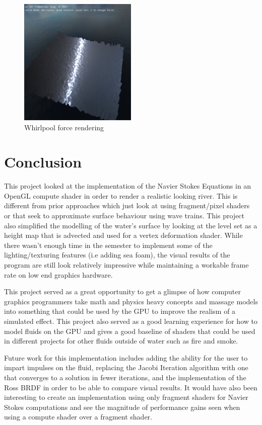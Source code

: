 \documentclass[conference]{IEEEtran}
\begin{document}
\begin{figure}[htbp]
\centerline{\includegraphics[width=0.5\textwidth]{whirl.png}}
\caption{Whirlpool force rendering}
\label{whirlrender}
\end{figure}

\section{Conclusion}

This project looked at the implementation of the Navier Stokes Equations in an OpenGL compute shader in order to render a realistic looking river. This is different from prior approaches which just look at using fragment/pixel shaders or that seek to approximate surface behaviour using wave trains. This project also simplified the modelling of the water's surface by looking at the level set as a height map that is advected and used for a vertex deformation shader. While there wasn't enough time in the semester to implement some of the lighting/texturing features (i.e adding sea foam), the visual results of the program are still look relatively impressive while maintaining a workable frame rate on low end graphics hardware.

This project served as a great opportunity to get a glimpse of how computer graphics programmers take math and physics heavy concepts and massage models into something that could be used by the GPU to improve the realism of a simulated effect. This project also served as a good learning experience for how to model fluids on the GPU and gives a good baseline of shaders that could be used in different projects for other fluids outside of water such as fire and smoke.

Future work for this implementation includes adding the ability for the user to impart impulses on the fluid, replacing the Jacobi Iteration algorithm with one that converges to a solution in fewer iterations, and the implementation of the Ross BRDF in order to be able to compare visual results. It would have also been interesting to create an implementation using only fragment shaders for Navier Stokes computations and see the magnitude of performance gains seen when using a compute shader over a fragment shader.
\end{document}
